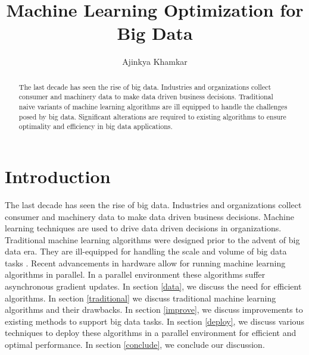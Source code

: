 \documentclass[sigconf]{acmart}
\begin{document}
\title{Machine Learning Optimization for Big Data}

\author{Ajinkya Khamkar}


\renewcommand{\shortauthors}{A. Khamkar}


\begin{abstract}
The last decade has seen the rise of big data. Industries and organizations collect consumer and machinery data to make data driven business decisions. Traditional naive variants of machine learning algorithms are ill equipped to handle the challenges posed by big data. Significant alterations are required to existing algorithms to ensure optimality and efficiency in big data applications.
\end{abstract}



\maketitle


\section{Introduction}

The last decade has seen the rise of big data. Industries and organizations collect consumer and machinery data to make data driven business decisions. Machine learning techniques are used to drive data driven decisions in organizations. Traditional machine learning algorithms were designed prior to the advent of big data era. They are ill-equipped for handling the scale and volume of big data tasks \cite{Papamakarios14comparisonof}. Recent advancements in hardware allow for running machine learning algorithms in parallel. In a parallel environment these algorithms suffer asynchronous gradient updates. In section \ref{data}, we discuss the need for efficient algorithms. In section \ref{traditional} we discuss traditional machine learning algorithms and their drawbacks. In section \ref{improve}, we discuss improvements to existing methods to support big data tasks. In section \ref{deploy},  we discuss various techniques to deploy these algorithms in a parallel environment for efficient and optimal performance. In section \ref{conclude}, we conclude our discussion.
\end{document}
